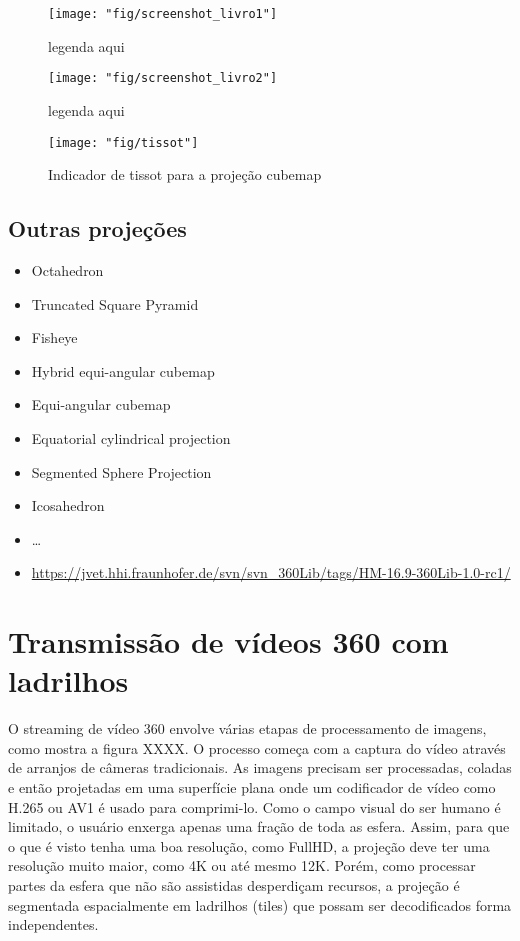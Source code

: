 \begin{figure}[tbh]
	\centering
	\texttt{[image: "fig/screenshot\_livro1"]}
	\caption{legenda aqui}
	\label{fig:screenshot_livro1}
\end{figure}

\begin{figure}[tbh]
	\centering
	\texttt{[image: "fig/screenshot\_livro2"]}
	\caption{legenda aqui}
	\label{fig:screenshot_livro2}
\end{figure}

\begin{figure}[tbh]
	\centering
	\texttt{[image: "fig/tissot"]}
	\caption{Indicador de tissot para a projeção cubemap}
	\label{fig:tissot}
\end{figure}

\subsection{Outras projeções}

\begin{itemize}
	\item Octahedron
	\item Truncated Square Pyramid
	\item Fisheye
	\item Hybrid equi-angular cubemap
	\item Equi-angular cubemap
	\item Equatorial cylindrical projection
	\item Segmented Sphere Projection
	\item Icosahedron
	\item …
	\item \url{https://jvet.hhi.fraunhofer.de/svn/svn_360Lib/tags/HM-16.9-360Lib-1.0-rc1/}
\end{itemize}

\section{Transmissão de vídeos 360 com ladrilhos}

O streaming de vídeo 360 envolve várias etapas de processamento de imagens, como mostra a figura XXXX. O processo começa com a captura do vídeo através de arranjos de câmeras tradicionais. As imagens precisam ser processadas, coladas e então projetadas em uma superfície plana onde um codificador de vídeo como H.265 ou AV1 é usado para comprimi-lo. Como o campo visual do ser humano é limitado, o usuário enxerga apenas uma fração de toda as esfera. Assim, para que o que é visto tenha uma boa resolução, como FullHD, a projeção deve ter uma resolução muito maior, como 4K ou até mesmo 12K. Porém, como processar partes da esfera que não são assistidas desperdiçam recursos, a projeção é segmentada espacialmente em ladrilhos (tiles) que possam ser decodificados forma independentes.


